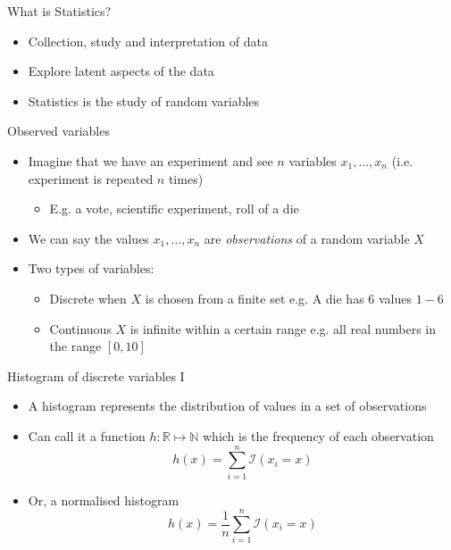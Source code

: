 \documentclass{beamer}
\begin{document}
\begin{frame}{What is Statistics?}  
 \begin{itemize} 
\item Collection, study and interpretation of data 
\item Explore latent aspects of the data 
\item Statistics is the study of random variables  
 \end{itemize}
\end{frame}

\begin{frame}{Observed variables}
\begin{itemize} 
 \item Imagine that we have an experiment and see $n$ variables $x_1, \ldots, x_n$ (i.e. experiment is repeated $n$ times)
\begin{itemize} 
\item E.g. a vote, scientific experiment, roll of a die
\end{itemize}
\item We can say the values $x_1, \ldots, x_n$ are \emph{observations} of a random variable $X$ 
\item Two types of variables: 
\begin{itemize} 
 \item Discrete when $X$ is chosen from a finite set e.g. A die has 6 values $1-6$ 
\item Continuous $X$ is infinite within a certain range e.g. all real numbers in the range $[0, 10]$
\end{itemize}
\end{itemize}
\end{frame}

\begin{frame}{Histogram of discrete variables I} 
\begin{itemize} 
 \item A histogram represents the distribution of values in a set of observations
\item Can call it a function $h: \mathbb{R} \mapsto \mathbb{N}$ which is the frequency of each observation 
\begin{displaymath} 
 h(x) = \sum_{i=1}^n \mathcal{I}(x_i = x)
\end{displaymath}
\item Or, a normalised histogram
\begin{displaymath} 
  h(x) = \frac{1}{n}\sum_{i=1}^n \mathcal{I}(x_i = x)
\end{displaymath}
\end{itemize}
\end{frame}
\end{document}
